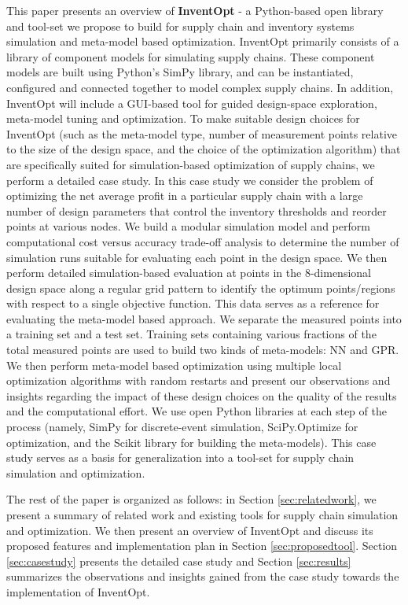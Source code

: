 This paper presents an overview of \textbf{InventOpt} - a Python-based open library and tool-set we propose to build for supply chain and inventory systems simulation and meta-model based optimization. InventOpt primarily consists of  a library of component models for simulating supply chains. These component models are built using Python's SimPy library, and can be instantiated, configured and connected together to model complex supply chains. In addition, InventOpt will include a GUI-based tool for guided design-space exploration, meta-model tuning and optimization. To make suitable design choices for InventOpt (such as the meta-model type, number of measurement points relative to the size of the design space, and the choice of the optimization algorithm) that are specifically suited for simulation-based optimization of supply chains, we perform a detailed case study.  In this case study we consider the problem of optimizing the net average profit in a particular supply chain with a large number of design parameters that control the inventory thresholds and reorder points at various nodes.  We build a modular simulation model and perform computational cost versus accuracy trade-off analysis to determine the number of simulation runs suitable for evaluating each point in the design space.  We then perform detailed simulation-based evaluation at points in the 8-dimensional design space along a regular grid pattern to identify the optimum points/regions with respect to a single objective function. This data serves as a reference for evaluating the meta-model based approach. We separate the measured points into a training set and a test set. Training sets containing various fractions of the total measured points are used to build two kinds of meta-models: NN and GPR. We then perform meta-model based optimization using multiple local optimization algorithms with random restarts and present our observations and insights regarding the impact of these design choices on the quality of the results and the computational effort. We use open Python libraries at each step of the process (namely, SimPy \cite{SimPy} for discrete-event simulation, SciPy.Optimize \cite{2020SciPy-NMeth} for optimization, and the Scikit library for building the meta-models). This case study serves as a basis for generalization into a tool-set for supply chain simulation and optimization. 

The rest of the paper is organized as follows: in Section \ref{sec:relatedwork}, we present a summary of related work and existing tools for supply chain simulation and optimization. We then present an overview of InventOpt and discuss its proposed features and implementation plan in Section \ref{sec:proposedtool}.  Section \ref{sec:casestudy} presents the detailed case study and Section \ref{sec:results} summarizes the observations and insights gained from the case study towards the implementation of InventOpt.

